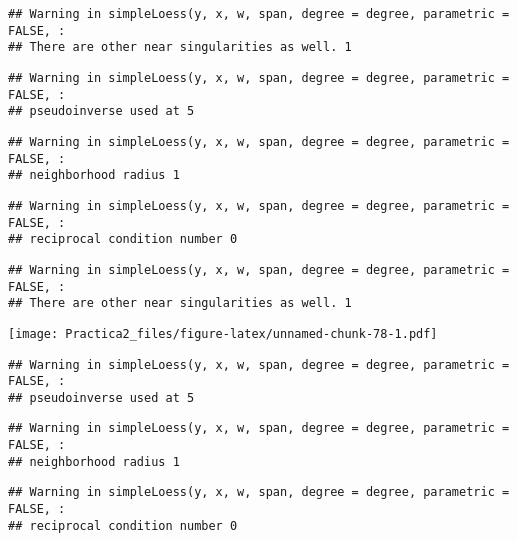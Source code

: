 \documentclass[
]{article}
\newenvironment{Shaded}{\begin{snugshade}}{\end{snugshade}}
\newcommand{\FunctionTok}[1]{\textcolor[rgb]{0.00,0.00,0.00}{#1}}
\newcommand{\NormalTok}[1]{#1}
\newcommand{\SpecialCharTok}[1]{\textcolor[rgb]{0.00,0.00,0.00}{#1}}
\begin{document}
\begin{verbatim}
## Warning in simpleLoess(y, x, w, span, degree = degree, parametric = FALSE, :
## There are other near singularities as well. 1
\end{verbatim}

\begin{verbatim}
## Warning in simpleLoess(y, x, w, span, degree = degree, parametric = FALSE, :
## pseudoinverse used at 5
\end{verbatim}

\begin{verbatim}
## Warning in simpleLoess(y, x, w, span, degree = degree, parametric = FALSE, :
## neighborhood radius 1
\end{verbatim}

\begin{verbatim}
## Warning in simpleLoess(y, x, w, span, degree = degree, parametric = FALSE, :
## reciprocal condition number 0
\end{verbatim}

\begin{verbatim}
## Warning in simpleLoess(y, x, w, span, degree = degree, parametric = FALSE, :
## There are other near singularities as well. 1
\end{verbatim}

\texttt{[image: Practica2\_files/figure-latex/unnamed-chunk-78-1.pdf]}

\begin{Shaded}
\end{Shaded}

\begin{verbatim}
## Warning in simpleLoess(y, x, w, span, degree = degree, parametric = FALSE, :
## pseudoinverse used at 5
\end{verbatim}

\begin{verbatim}
## Warning in simpleLoess(y, x, w, span, degree = degree, parametric = FALSE, :
## neighborhood radius 1
\end{verbatim}

\begin{verbatim}
## Warning in simpleLoess(y, x, w, span, degree = degree, parametric = FALSE, :
## reciprocal condition number 0
\end{verbatim}
\end{document}
